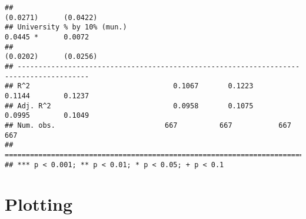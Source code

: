 \documentclass[
]{article}
\begin{document}
\begin{verbatim}
##                                                                (0.0271)      (0.0422)  
## University % by 10% (mun.)                                      0.0445 *      0.0072   
##                                                                (0.0202)      (0.0256)  
## ---------------------------------------------------------------------------------------
## R^2                                  0.1067       0.1223        0.1144        0.1237   
## Adj. R^2                             0.0958       0.1075        0.0995        0.1049   
## Num. obs.                          667          667           667           667        
## =======================================================================================
## *** p < 0.001; ** p < 0.01; * p < 0.05; + p < 0.1
\end{verbatim}

\hypertarget{plotting}{%
\section{Plotting}\label{plotting}}
\end{document}
